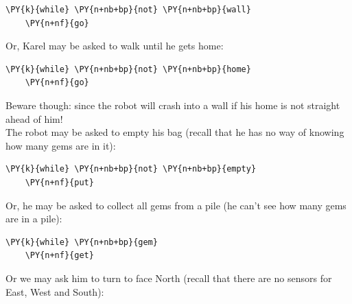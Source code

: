 \begin{bbox}
\begin{Verbatim}[commandchars=\\\{\}]
\PY{k}{while} \PY{n+nb+bp}{not} \PY{n+nb+bp}{wall}
    \PY{n+nf}{go}
\end{Verbatim}
\end{bbox}
\vspace{6mm}

\noindent
Or, Karel may be asked to walk until he gets home:\\

\begin{bbox}
\begin{Verbatim}[commandchars=\\\{\}]
\PY{k}{while} \PY{n+nb+bp}{not} \PY{n+nb+bp}{home}
    \PY{n+nf}{go}
\end{Verbatim}
\end{bbox}
\vspace{6mm}

\noindent
Beware though: {\color{red}{this program is dangerous}} since the robot will crash into a wall
if his home is not straight ahead of him!\\

\noindent
The robot may be asked to empty his bag (recall that he has no way of knowing 
how many gems are in it):\\
 
\begin{bbox}
\begin{Verbatim}[commandchars=\\\{\}]
\PY{k}{while} \PY{n+nb+bp}{not} \PY{n+nb+bp}{empty}
    \PY{n+nf}{put}
\end{Verbatim}
\end{bbox}
\vspace{6mm}

\noindent
Or, he may be asked to collect all gems from a pile (he can't see
how many gems are in a pile):\\

\begin{bbox}
\begin{Verbatim}[commandchars=\\\{\}]
\PY{k}{while} \PY{n+nb+bp}{gem}
    \PY{n+nf}{get}
\end{Verbatim}
\end{bbox}
\vspace{6mm}

\noindent
Or we may ask him to turn to face North (recall that there are no sensors for 
East, West and South):\\

